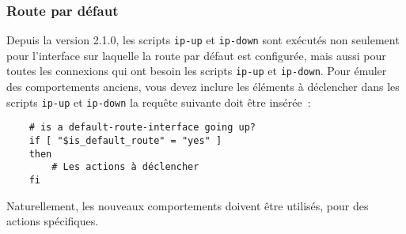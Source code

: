 \subsubsection{Route par défaut}

Depuis la version 2.1.0, les scripts \texttt{ip-up} et \texttt{ip-down} sont exécutés
non seulement pour l'interface sur laquelle la route par défaut est configurée, mais
aussi pour toutes les connexions qui ont besoin les scripts \texttt{ip-up} et \texttt{ip-down}.
Pour émuler des comportements anciens, vous devez inclure les éléments à déclencher
dans les scripts \texttt{ip-up} et \texttt{ip-down} la requête suivante doit être insérée~:

\begin{example}
\begin{verbatim}
    # is a default-route-interface going up?
    if [ "$is_default_route" = "yes" ]
    then
        # Les actions à déclencher
    fi
\end{verbatim}
\end{example}

Naturellement, les nouveaux comportements doivent être utilisés, pour des actions spécifiques.


